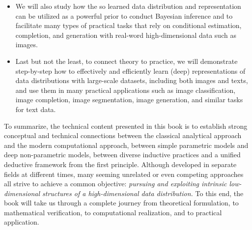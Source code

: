 \documentclass[../../book-main.tex]{subfiles}
\begin{document}
\begin{itemize}
\item We will also study how the so learned data distribution and representation can be utilized as a powerful prior to conduct Bayesian inference and to facilitate many types of practical tasks that rely on conditional estimation, completion, and generation with real-word high-dimensional data such as images. 

\item Last but not the least, to connect theory to practice, we will demonstrate step-by-step how to effectively and efficiently learn (deep) representations of data distributions with large-scale datasets, including both images and texts, and use them in many practical applications such as image classification, image completion, image segmentation, image generation, and similar tasks for text data. 
\end{itemize}

To summarize, the technical content presented in this book is to establish strong conceptual and technical connections between the classical analytical approach and the modern computational approach, between simple parametric models and deep non-parametric models, between diverse inductive practices and a unified deductive framework from the first principle. Although developed in separate fields at different times, many seeming unrelated or even competing approaches all strive to achieve a common objective: {\em pursuing and exploiting intrinsic low-dimensional structures of a high-dimensional data distribution.} To this end, the book will take us through a complete journey from theoretical formulation, to mathematical verification, to computational realization, and to practical application.
\end{document}
